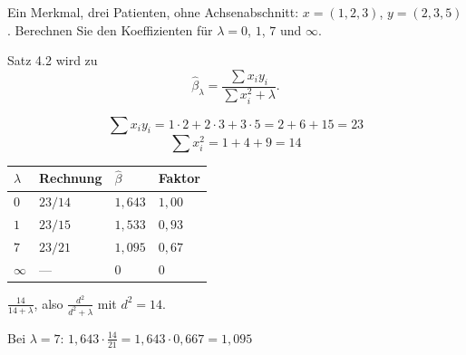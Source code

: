 \begin{aufgabe}
Ein Merkmal, drei Patienten, ohne Achsenabschnitt: $x = (1,2,3)$, $y = (2,3,5)$. Berechnen Sie den Koeffizienten für $\lambda = 0$, $1$, $7$ und $\infty$.

\loesung
{}
Satz 4.2 wird zu
\[ \hat\beta_{\lambda} = \frac{\sum x_i y_i}{\sum x_i^{2} + \lambda} . \]

\[ \sum x_i y_i = 1\cdot2 + 2\cdot3 + 3\cdot5 = 2+6+15 = 23 \]
\[ \sum x_i^{2} = 1+4+9 = 14 \]

\begin{center}
{\small
\renewcommand{\arraystretch}{1.48}
\begin{tabular}{@{}P{1.6cm}P{2.4cm}P{2.0cm}P{2.0cm}@{}}
\toprule
$\lambda$ & \textbf{Rechnung} & $\hat\beta$ & \textbf{Faktor}\\
\midrule
$0$ & $23/14$ & $1{,}643$ & $1{,}00$\\
$1$ & $23/15$ & $1{,}533$ & $0{,}93$\\
$7$ & $23/21$ & $1{,}095$ & $0{,}67$\\
$\infty$ & --- & $0$ & $0$\\
\bottomrule
\end{tabular}}
\end{center}

 $\frac{14}{14+\lambda}$, also $\frac{d^{2}}{d^{2}+\lambda}$ mit $d^{2} = 14$.

Bei $\lambda = 7$: $1{,}643\cdot\frac{14}{21} = 1{,}643\cdot0{,}667 = 1{,}095$ \checkmark

\begin{center}
\begin{minipage}{0.88\textwidth}
\end{minipage}
\end{center}
\end{aufgabe}

